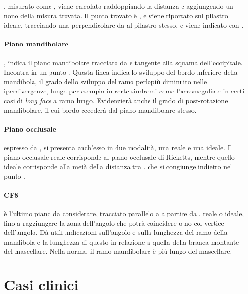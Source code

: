 , misurato come , viene calcolato raddoppiando la distanza  e aggiungendo un nono della misura trovata. Il punto trovato è , e viene riportato sul pilastro ideale, tracciando una perpendicolare da  al pilastro stesso, e viene indicato con .\\

\paragraph{Piano mandibolare} , indica il piano mandibolare tracciato da  e tangente alla squama dell'occipitale. Incontra  in un punto . Questa linea indica lo sviluppo del bordo inferiore della mandibola, il grado dello sviluppo del ramo perlopiù diminuito nelle iperdivergenze, lungo per esempio in certe sindromi come l'acromegalia e in certi casi di \emph{long face} a ramo lungo. Evidenzierà anche il grado di post-rotazione mandibolare, il cui bordo eccederà dal piano mandibolare stesso.

\paragraph{Piano occlusale} espresso da , si presenta anch'esso in due modalità, una reale e una ideale. Il piano occlusale reale corrisponde al piano occlusale di Ricketts, mentre quello ideale corrisponde alla metà della distanza tra , che si congiunge indietro nel punto .\\

\paragraph{CF8} è l'ultimo piano da considerare, tracciato parallelo a  a partire da , reale o ideale, fino a raggiungere la zona dell'angolo che potrà coincidere o no col vertice dell'angolo. Dà utili indicazioni sull'angolo e sulla lunghezza del ramo della mandibola e la lunghezza di questo in relazione a quella della branca montante del mascellare. Nella norma, il ramo mandibolare è più lungo del mascellare.


\section{Casi clinici}
